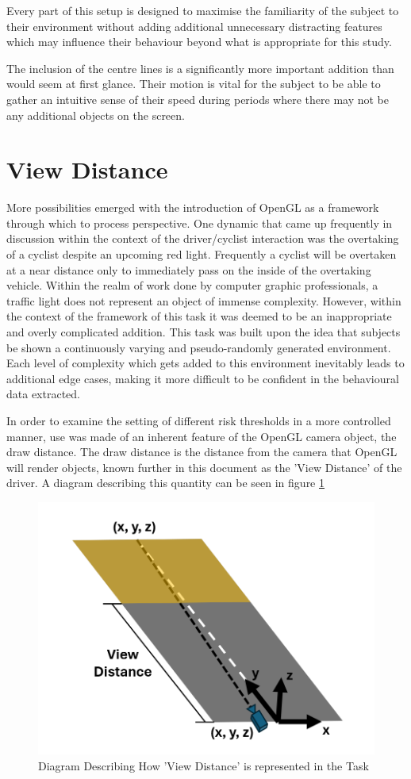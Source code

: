 Every part of this setup is designed to maximise the familiarity of the subject to their environment without adding additional unnecessary distracting features which may influence their behaviour beyond what is appropriate for this study.

The inclusion of the centre lines is a significantly more important addition than would seem at first glance. Their motion is vital for the subject to be able to gather an intuitive sense of their speed during periods where there may not be any additional objects on the screen.
\section{View Distance}
More possibilities emerged with the introduction of OpenGL as a framework through which to process perspective. One dynamic that came up frequently in discussion within the context of the driver/cyclist interaction was the overtaking of a cyclist despite an upcoming red light. Frequently a cyclist will be overtaken at a near distance only to immediately pass on the inside of the overtaking vehicle. Within the realm of work done by computer graphic professionals, a traffic light does not represent an object of immense complexity. However, within the context of the framework of this task it was deemed to be an inappropriate and overly complicated addition. This task was built upon the idea that subjects be shown a continuously varying and pseudo-randomly generated environment. Each level of complexity which gets added to this environment inevitably leads to additional edge cases, making it more difficult to be confident in the behavioural data extracted.

In order to examine the setting of different risk thresholds in a more controlled manner, use was made of an inherent feature of the OpenGL camera object, the draw distance. The draw distance is the distance from the camera that OpenGL will render objects, known further in this document as the 'View Distance' of the driver. A diagram describing this quantity can be seen in figure \ref{fig:ViewDist}

\begin{figure}[H]
    \centering
    \includegraphics[width=0.45\linewidth]{figures/Camera Viewing.png}
    \caption{Diagram Describing How 'View Distance' is represented in the Task}
    \label{fig:ViewDist}
\end{figure}

